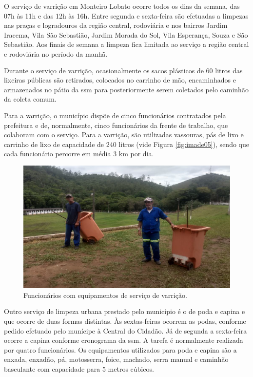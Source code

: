 	O serviço de varrição em Monteiro Lobato ocorre todos os dias da semana, das 07h às 11h e das 12h às 16h. Entre segunda e sexta-feira são efetuadas a limpezas nas praças e logradouros da região central, rodoviária e nos bairros Jardim Iracema, Vila São Sebastião, Jardim Morada do Sol, Vila Esperança, Souza e São Sebastião. Aos finais de semana a limpeza fica limitada ao serviço a região central e rodoviária no período da manhã.
	
	Durante o serviço de varrição, ocasionalmente os sacos plásticos de 60 litros das lixeiras públicas são retirados, colocados no carrinho de mão, encaminhados e armazenados no pátio da \gls{ssm} para posteriormente serem coletados pelo caminhão da coleta comum.
	
	Para a varrição, o município dispõe de cinco funcionários contratados pela prefeitura e de, normalmente, cinco funcionários da frente de trabalho, que colaboram com o serviço. Para a varrição, são utilizadas vassouras, pás de lixo e carrinho de lixo de capacidade de 240 litros (vide Figura \ref{fig:imade05}), sendo que cada funcionário percorre em média 3 km por dia.

	\begin{figure}
		\centering
		\includegraphics[width=0.75\linewidth]{produtos/prodtres/image051}
		\caption{Funcionários com equipamentos de serviço de varrição.}
		\label{fig:image051}
	\end{figure}
	

	Outro serviço de limpeza urbana prestado pelo município é o de poda e capina e que ocorre de duas formas distintas. Às sextas-feiras ocorrem as podas, conforme pedido efetuado pelo munícipe à Central do Cidadão. Já de segunda a sexta-feira ocorre a capina conforme cronograma da \gls{ssm}. A tarefa é normalmente realizada por quatro funcionários. Os equipamentos utilizados para poda e capina são a enxada, enxadão, pá, motosserra, foice, machado, serra manual e caminhão basculante com capacidade para 5 metros cúbicos.
	
